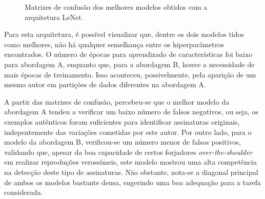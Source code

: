 \begin{figure}[h]
	\centering
	\caption{Matrizes de confusão dos melhores modelos obtidos com a arquitetura LeNet.}\label{fig:matrizes-lenet}
\end{figure}


Para esta arquitetura, é possível visualizar que, dentre os dois modelos tidos como melhores, não há qualquer semelhança entre os hiperparâmetros encontrados. O número de épocas para aprendizado de características foi baixo para abordagem A, enquanto que, para a abordagem B, houve a necessidade de mais épocas de treinamento. Isso aconteceu, possivelmente, pela aparição de um mesmo autor em partições de dados diferentes na abordagem A.

A partir das matrizes de confusão, percebeu-se que o melhor modelo da abordagem A tendeu a verificar um baixo número de falsos negativos, ou seja, os exemplos autênticos foram suficientes para identificar assinaturas originais, indepentemente das variações cometidas por este autor. Por outro lado, para o modelo da abordagem B, verificou-se um número menor de falsos positivos, validando que, apesar da boa capacidade de certos forjadores \emph{over-the-shoulder} em realizar reproduções verossímeis, este modelo mostrou uma alta competência na detecção deste tipo de assinaturas. Não obstante, nota-se a diagonal principal de ambos os modelos bastante densa, sugerindo uma boa adequação para a tarefa considerada.
